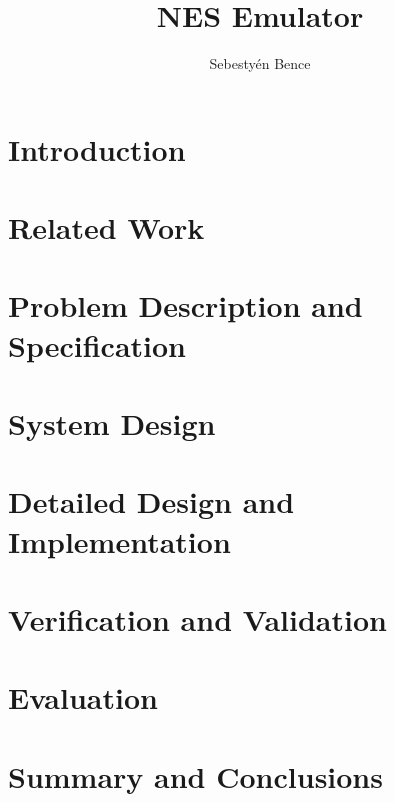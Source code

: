 \documentclass[]{report}
\title{NES Emulator}
\author{Sebestyén Bence}
\begin{document}
\maketitle

\tableofcontents

\clearpage

\section{Introduction}

\section{Related Work}

\section{Problem Description and Specification }

\section{System Design}

\section{Detailed Design and Implementation}

\section{Verification and Validation }

\section{Evaluation}

\section{Summary and Conclusions}


\begin{abstract}
\end{abstract}
\end{document}
